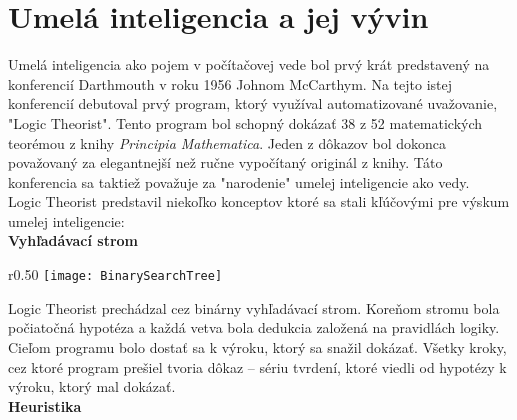\chapter{Umelá inteligencia a jej vývin}
Umelá inteligencia ako pojem v počítačovej vede bol prvý krát predstavený na konferencií Darthmouth v roku 1956 Johnom McCarthym\cite{Corduck}. Na tejto istej konferencií debutoval prvý program, ktorý využíval automatizované uvažovanie, "Logic Theorist". Tento program bol schopný dokázať 38 z 52 matematických teorémou z knihy \textit{Principia Mathematica}. Jeden z dôkazov bol dokonca považovaný za elegantnejší než ručne vypočítaný originál z knihy. Táto konferencia sa taktiež považuje za "narodenie" umelej inteligencie ako vedy.\\Logic Theorist predstavil niekoľko konceptov ktoré sa stali kľúčovými pre výskum umelej inteligencie:\\\textbf{Vyhľadávací strom}\\
\begin{wrapfigure}{r}{0.50\textwidth}
    \centering
    \texttt{[image: BinarySearchTree]}
\end{wrapfigure}Logic Theorist prechádzal cez binárny vyhľadávací strom. Koreňom stromu bola počiatočná hypotéza a každá vetva bola dedukcia založená na pravidlách logiky. Cieľom programu bolo dostať sa k výroku, ktorý sa snažil dokázať. Všetky kroky, cez ktoré program prešiel tvoria dôkaz – sériu tvrdení, ktoré viedli od hypotézy k výroku, ktorý mal dokázať.\\\textbf{Heuristika}  